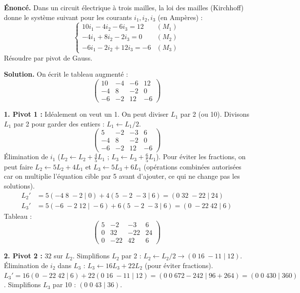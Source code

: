 \documentclass[11pt]{article}
\begin{document}
\begin{exoresolu}
\textbf{Énoncé.} Dans un circuit électrique à trois mailles, la loi des mailles (Kirchhoff) donne le système suivant pour les courants $i_1, i_2, i_3$ (en Ampères) :
\[
\begin{cases}
10 i_1 - 4 i_2 - 6 i_3 = 12 & (M_1)\\
-4 i_1 + 8 i_2 - 2 i_3 = 0 & (M_2)\\
-6 i_1 - 2 i_2 + 12 i_3 = -6 & (M_3)
\end{cases}
\]
Résoudre par pivot de Gauss.

\tcblower
\textbf{Solution.}
On écrit le tableau augmenté :
\[
\left(\begin{array}{ccc|c}
10 & -4 & -6 & 12 \\
-4 & 8 & -2 & 0 \\
-6 & -2 & 12 & -6
\end{array}\right)
\]

\textbf{1. Pivot 1 :} Idéalement on veut un 1. On peut diviser $L_1$ par 2 (ou 10). Divisons $L_1$ par 2 pour garder des entiers : $L_1 \leftarrow L_1/2$.
\[
\left(\begin{array}{ccc|c}
5 & -2 & -3 & 6 \\
-4 & 8 & -2 & 0 \\
-6 & -2 & 12 & -6
\end{array}\right)
\]
Élimination de $i_1$ ($L_2 \leftarrow L_2 + \frac{4}{5}L_1$ ; $L_3 \leftarrow L_3 + \frac{6}{5}L_1$). Pour éviter les fractions, on peut faire $L_2 \leftarrow 5L_2 + 4L_1$ et $L_3 \leftarrow 5L_3 + 6L_1$ (opérations combinées autorisées car on multiplie l'équation cible par 5 avant d'ajouter, ce qui ne change pas les solutions).
\begin{align*}
L_2' &= 5(-4\; 8\; -2\; |\; 0) + 4(5\; -2\; -3\; |\; 6) = (0\; 32\; -22\; |\; 24) \\
L_3' &= 5(-6\; -2\; 12\; |\; -6) + 6(5\; -2\; -3\; |\; 6) = (0\; -22\; 42\; |\; 6)
\end{align*}
Tableau :
\[
\left(\begin{array}{ccc|c}
5 & -2 & -3 & 6 \\
0 & 32 & -22 & 24 \\
0 & -22 & 42 & 6
\end{array}\right)
\]

\textbf{2. Pivot 2 :} $32$ sur $L_2$. Simplifions $L_2$ par 2 : $L_2 \leftarrow L_2/2 \to (0\; 16\; -11\; |\; 12)$.
Élimination de $i_2$ dans $L_3$ : $L_3 \leftarrow 16 L_3 + 22 L_2$ (pour éviter fractions).
$L_3' = 16(0\; -22\; 42\; |\; 6) + 22(0\; 16\; -11\; |\; 12) = (0\; 0\; 672-242\; |\; 96+264) = (0\; 0\; 430\; |\; 360)$.
Simplifions $L_3$ par 10 : $(0\; 0\; 43\; |\; 36)$.


\end{exoresolu}
\end{document}
